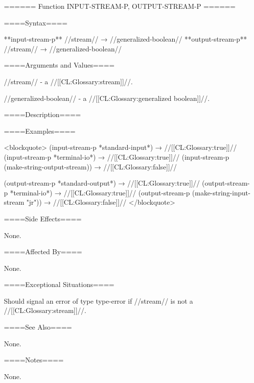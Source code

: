====== Function INPUT-STREAM-P, OUTPUT-STREAM-P ======

====Syntax====

**input-stream-p** //stream// → //generalized-boolean// **output-stream-p** //stream// → //generalized-boolean//

====Arguments and Values====

//stream// - a //[[CL:Glossary:stream]]//.

//generalized-boolean// - a //[[CL:Glossary:generalized boolean]]//.

====Description====



====Examples====

<blockquote> (input-stream-p *standard-input*) → //[[CL:Glossary:true]]// (input-stream-p *terminal-io*) → //[[CL:Glossary:true]]// (input-stream-p (make-string-output-stream)) → //[[CL:Glossary:false]]//

(output-stream-p *standard-output*) → //[[CL:Glossary:true]]// (output-stream-p *terminal-io*) → //[[CL:Glossary:true]]// (output-stream-p (make-string-input-stream "jr")) → //[[CL:Glossary:false]]// </blockquote>

====Side Effects====

None.

====Affected By====

None.

====Exceptional Situations====

Should signal an error of type type-error if //stream// is not a //[[CL:Glossary:stream]]//.

====See Also====

None.

====Notes====

None.

